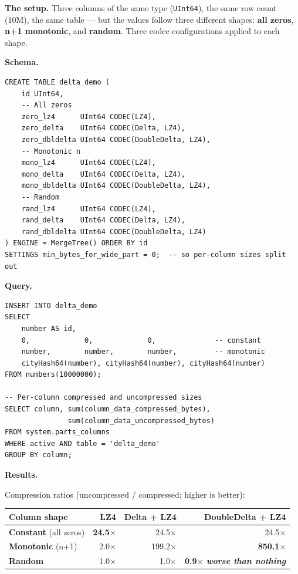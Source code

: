 \documentclass[11pt]{article}
\renewcommand{\arraystretch}{1.15}
\newcommand{\loseA}{\cellcolor{accentred!12}}
\newcommand{\schemaHd}{%
  \par\smallskip\noindent\textbf{\color{accentblue}Schema.}\par\nopagebreak\smallskip}
\newcommand{\queryHd}{%
  \par\smallskip\noindent\textbf{\color{accentblue}Query.}\par\nopagebreak\smallskip}
\newcommand{\resultsHd}{%
  \par\smallskip\noindent\textbf{\color{accentblue}Results.}\par\nopagebreak\smallskip}
\begin{document}
\textbf{The setup.}
Three columns of the same type (\texttt{UInt64}), the same row count
(10M), the same table — but the values follow three different shapes:
\textbf{all zeros}, \textbf{n+1 monotonic}, and \textbf{random}.
Three codec configurations applied to each shape.

\schemaHd
\begin{lstlisting}
CREATE TABLE delta_demo (
    id UInt64,
    -- All zeros
    zero_lz4      UInt64 CODEC(LZ4),
    zero_delta    UInt64 CODEC(Delta, LZ4),
    zero_dbldelta UInt64 CODEC(DoubleDelta, LZ4),
    -- Monotonic n
    mono_lz4      UInt64 CODEC(LZ4),
    mono_delta    UInt64 CODEC(Delta, LZ4),
    mono_dbldelta UInt64 CODEC(DoubleDelta, LZ4),
    -- Random
    rand_lz4      UInt64 CODEC(LZ4),
    rand_delta    UInt64 CODEC(Delta, LZ4),
    rand_dbldelta UInt64 CODEC(DoubleDelta, LZ4)
) ENGINE = MergeTree() ORDER BY id
SETTINGS min_bytes_for_wide_part = 0;  -- so per-column sizes split out
\end{lstlisting}

\queryHd
\begin{lstlisting}
INSERT INTO delta_demo
SELECT
    number AS id,
    0,             0,             0,              -- constant
    number,        number,        number,         -- monotonic
    cityHash64(number), cityHash64(number), cityHash64(number)
FROM numbers(10000000);

-- Per-column compressed and uncompressed sizes
SELECT column, sum(column_data_compressed_bytes),
               sum(column_data_uncompressed_bytes)
FROM system.parts_columns
WHERE active AND table = 'delta_demo'
GROUP BY column;
\end{lstlisting}

\resultsHd
Compression ratios (uncompressed / compressed; higher is better):

\renewcommand{\arraystretch}{1.20}
\begin{tabularx}{\linewidth}{@{}X r r r@{}}
\toprule
\textbf{Column shape}         & \textbf{LZ4} & \textbf{Delta + LZ4} & \textbf{DoubleDelta + LZ4}\\
\midrule
\rowcolor{accentgreen!12}\textbf{Constant} (all zeros)
                              & \textbf{24.5$\times$} & 24.5$\times$ & 24.5$\times$\\
\rowcolor{accentgreen!12}\textbf{Monotonic} (n+1)
                              & 2.0$\times$           & 199.2$\times$ & \textbf{850.1$\times$}\\
\textbf{Random}               & 1.0$\times$           & 1.0$\times$   & \loseA \textbf{0.9$\times$ \emph{worse than nothing}}\\
\bottomrule
\end{tabularx}
\end{document}

